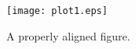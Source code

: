 \begin{figure}[H]
    \begin{center}
        \texttt{[image: plot1.eps]}
    \end{center}
    \caption{A properly aligned figure.}
    \label{fig:plot1}
\end{figure}

